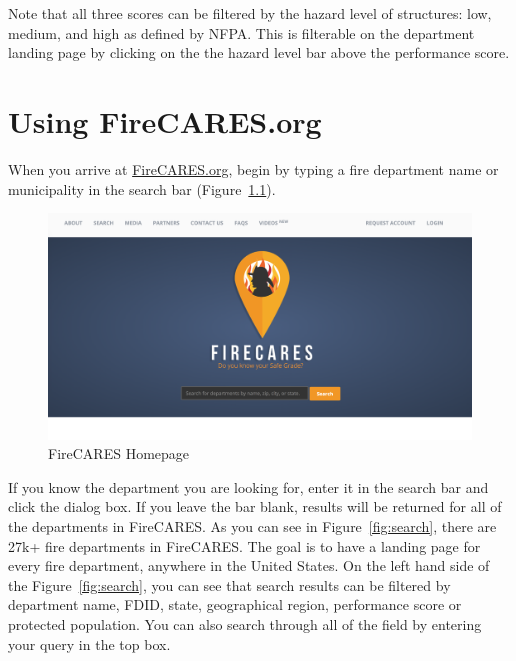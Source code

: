 \documentclass[12pt,oneside]{book}
\begin{document}
Note that all three scores can be filtered by the hazard level of structures: low, medium, and high as defined by NFPA. This is filterable on the department landing page by clicking on the the hazard level bar above the performance score. 

\chapter{Using FireCARES.org}

When you arrive at \href{https://firecares.org}{FireCARES.org}, begin by typing a fire department name or municipality in the search bar (Figure~\ref{fig:homepage}). 

\begin{figure}[ht!]
\centering
\includegraphics[width=.9\columnwidth]{Figures/homepage}
\caption{FireCARES Homepage}
\label{fig:homepage}
\end{figure}

If you know the department you are looking for, enter it in the search bar and click the dialog box. If you leave the bar blank, results will be returned for all of the departments in FireCARES. As you can see in Figure~\ref{fig:search}, there are 27k+ fire departments in FireCARES. The goal is to have a landing page for every fire department, anywhere in the United States. On the left hand side of the Figure~\ref{fig:search}, you can see that search results can be filtered by department name, FDID, state, geographical region, performance score or protected population. You can also search through all of the field by entering your query in the top box.
\end{document}
